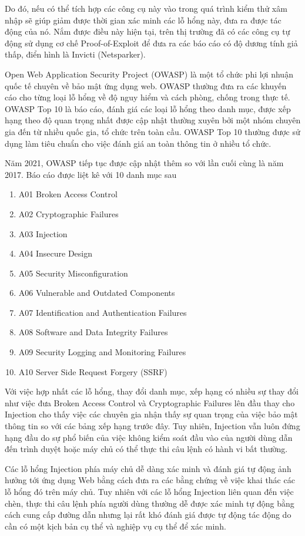 \documentclass[./../main.tex]{subfiles}
\begin{document}
Do đó, nếu có thể tích hợp các công cụ này vào trong quá trình kiểm thử xâm nhập sẽ giúp giảm được thời gian xác minh các lỗ hổng này, đưa ra được tác động của nó. Nắm được điều
này hiện tại, trên thị trường đã có các công cụ tự động sử dụng cơ chế Proof-of-Exploit để đưa ra các báo cáo có độ dương tính giả thấp, điển hình là Invicti (Netsparker).

Open Web Application Security Project (OWASP) là một tổ chức phi lợi nhuận quốc tế chuyên về bảo mật ứng dụng web. OWASP thường đưa ra các khuyến cáo cho từng loại lỗ hổng về
độ nguy hiểm và cách phòng, chống trong thực tế. OWASP Top 10 là báo cáo, đánh giá các loại lỗ hổng theo danh mục, được xếp hạng theo độ quan trọng nhất được cập nhật thường xuyên
bởi một nhóm chuyên gia đến từ nhiều quốc gia, tổ chức trên toàn cầu. OWASP Top 10 thường được sử dụng làm tiêu chuẩn cho việc đánh giá an toàn thông tin ở nhiều tổ chức.

Năm 2021, OWASP tiếp tục được cập nhật thêm so với lần cuối cùng là năm 2017. Báo cáo được liệt kê với 10 danh mục sau
\begin{enumerate}
	\item A01 Broken Access Control
	\item A02 Cryptographic Failures
	\item A03 Injection
	\item A04 Insecure Design
	\item A05 Security Misconfiguration
	\item A06 Vulnerable and Outdated Components
	\item A07 Identification and Authentication Failures
	\item A08 Software and Data Integrity Failures
	\item A09 Security Logging and Monitoring Failures
	\item A10 Server Side Request Forgery (SSRF)
\end{enumerate}
Với việc hợp nhất các lỗ hổng, thay đổi danh mục, xếp hạng có nhiều sự thay đổi như việc đưa Broken Access Control và Cryptographic Failures lên đầu thay cho Injection cho thấy việc các chuyên gia nhận thấy sự quan trọng của việc bảo mật thông tin so với các bảng xếp hạng trước đây. Tuy nhiên, Injection vẫn luôn đứng hạng đầu do sự phổ biến của việc không kiểm soát đầu vào của người dùng dẫn đến trình duyệt hoặc máy chủ có thể thực thi câu lệnh có hành vi bất thường.

Các lỗ hổng Injection phía máy chủ dễ dàng xác minh và đánh giá tự động ảnh hưởng tới ứng dụng Web bằng cách đưa ra các bằng chứng về việc khai thác các lỗ hổng đó trên máy chủ. Tuy nhiên với các lỗ hổng Injection liên quan đến việc chèn, thực thi câu lệnh phía người dùng thường dễ được xác minh tự động bằng cách cung cấp đường dẫn nhưng lại rất khó đánh giá được tự động tác động do cần có một kịch bản cụ thể và nghiệp vụ cụ thể để xác minh.
\end{document}
